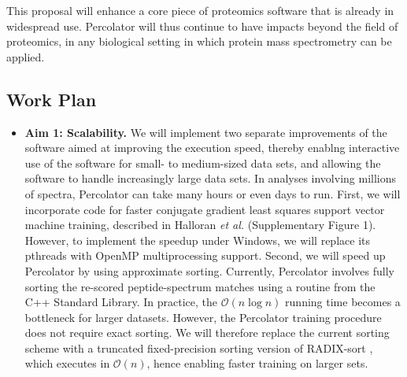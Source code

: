 \documentclass{article}
\begin{document}
This proposal will enhance a core piece of proteomics software that is
already in widespread use.  Percolator will thus continue to have
impacts beyond the field of proteomics, in any biological setting in
which protein mass spectrometry can be applied.

\subsection{Work Plan}

\begin{itemize}

\item {\bf Aim 1: Scalability.}  We will implement two separate improvements of the software aimed at improving the execution speed, thereby enablng interactive use of the software for small- to medium-sized data sets, and allowing the software to handle increasingly large data sets. In analyses involving millions of spectra, Percolator can take many hours or even days to run.
First, we will incorporate code for faster conjugate gradient least squares support vector machine training, described in Halloran {\em et al.} \cite{halloran:matter} (Supplementary Figure 1). However, to implement the speedup under Windows, we will replace its pthreads with OpenMP multiprocessing support.  Second, we will speed up Percolator by using approximate sorting. Currently, Percolator involves fully sorting the re-scored peptide-spectrum matches using a routine from the C++ Standard Library. In practice, the $\mathcal{O}(n \log n)$ running time becomes a bottleneck for larger datasets. However, the Percolator training procedure does not require exact sorting. We will therefore replace the current sorting scheme with a truncated fixed-precision sorting version of RADIX-sort \cite{cormen:introduction}, which executes in $\mathcal{O}(n)$, hence enabling faster training on larger sets.


\end{itemize}
\end{document}
